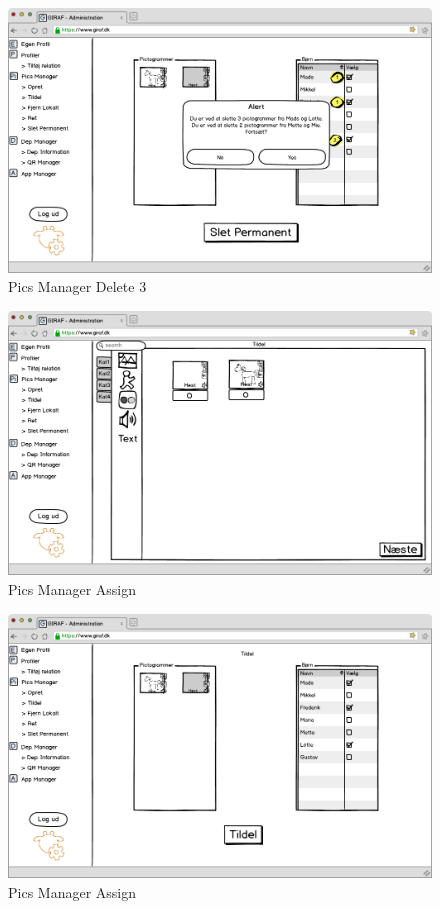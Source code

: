 \newpage

\begin{figure}[p]
\centering
\includegraphics[width=1\textwidth]{images/mockup/picsManagerSlet3.png}
\caption{Pics Manager Delete 3}
\label{fig:pics_manager_delete3}
\end{figure}

\begin{figure}[p]
\centering
\includegraphics[width=1\textwidth]{images/mockup/picsManagerTildel.png}
\caption{Pics Manager Assign}
\label{fig:pics_manager_assign}
\end{figure}

\newpage

\begin{figure}[p]
\centering
\includegraphics[width=1\textwidth]{images/mockup/picsManagerTildel2.png}
\caption{Pics Manager Assign}
\label{fig:pics_manager_assign2}
\end{figure}

